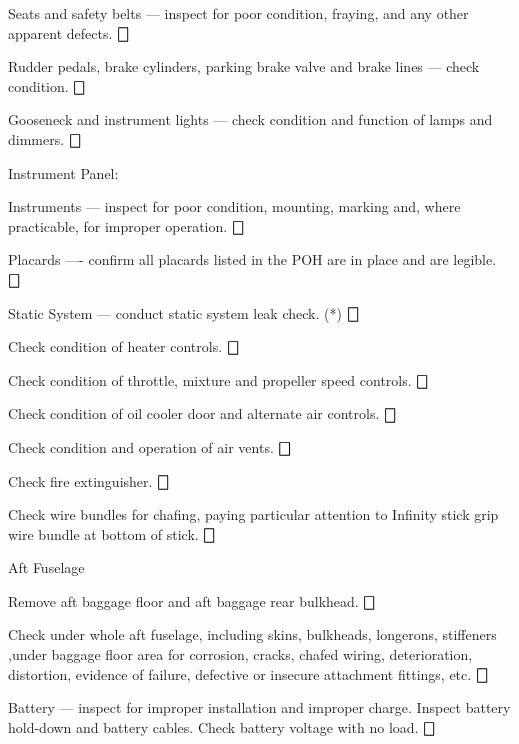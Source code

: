 \begin{enumerate*}
\begin{enumerate*}
		\item Seats and safety belts --- inspect for poor condition, fraying, and any other apparent defects. \dotfill $\bigbox$
		\item Rudder pedals, brake cylinders, parking brake valve and brake lines --- check condition. \dotfill $\bigbox$
		\item Gooseneck and instrument lights --- check condition and function of lamps and dimmers. \dotfill $\bigbox$
		\item Instrument Panel:
  	\begin{enumerate*}
  		\item Instruments --- inspect for poor condition, mounting, marking and, where practicable, for improper operation. \dotfill $\bigbox$
  		\item Placards ---- confirm all placards listed in the POH are in place and are legible. \dotfill $\bigbox$
  		\item Static System --- conduct static system leak check. (*) \dotfill $\bigbox$
      \end{enumerate*}
		\item Check condition of heater controls. \dotfill $\bigbox$
		\item Check condition of throttle, mixture and propeller speed controls. \dotfill $\bigbox$
		\item Check condition of oil cooler door and alternate air controls. \dotfill $\bigbox$
		\item Check condition and operation of air vents. \dotfill $\bigbox$
		\item Check fire extinguisher. \dotfill $\bigbox$
		\item Check wire bundles for chafing, paying particular attention to Infinity stick grip wire bundle at bottom of stick. \dotfill $\bigbox$
	\end{enumerate*}
	\item{Aft Fuselage} 
	\begin{enumerate*}
		\item Remove aft baggage floor and aft baggage rear bulkhead. \dotfill $\bigbox$
		\item Check under whole aft fuselage, including skins, bulkheads, longerons, stiffeners ,under baggage floor area for corrosion, cracks, chafed wiring, deterioration, distortion, evidence of failure, defective or insecure attachment fittings, etc. \dotfill $\bigbox$
		\item Battery --- inspect for improper installation and improper charge. Inspect battery hold-down and battery cables. Check battery voltage with no load. \dotfill $\bigbox$

\end{enumerate*}
\end{enumerate*}
